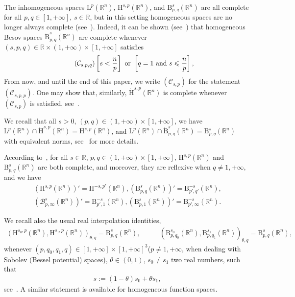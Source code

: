 \documentclass[AHL,Unicode,longabstracts,published]{cedram}
\newcommand{\bbR}{\mathbb{R}}
\newcommand{\rmH}{\mathrm{H}}%
\newcommand{\rmB}{\mathrm{B}}
\newcommand{\rmL}{\mathrm{L}}
\newcommand{\clB}{\mathcal{B}}
\newcommand{\clC}{\mathcal{C}}
\begin{document}
The inhomogeneous spaces $\rmL^p(\bbR^n)$, $\rmH^{s,p}(\bbR^n)$, and $\rmB^{s}_{p,q}(\bbR^n)$ are all complete for all $p,q\in [1,+\infty]$, $s\in\bbR$, but in this setting homogeneous spaces are no longer always complete (see~\cite[Proposition~1.34,~Remark~2.26]{bookBahouriCheminDanchin}). Indeed, it can be shown (see~\cite[Theorem~2.25]{bookBahouriCheminDanchin}) that homogeneous Besov spaces $\dot{\rmB}^{s}_{p,q}(\bbR^n)$ are complete whenever $(s,p,q)\in\bbR\times(1,+\infty)\times[1,+\infty]$ satisfies
\begin{equation}
\tag{$\clC_{s,p,q}$}\label{AssumptionCompletenessExponents}
\left[s<\frac{n}{p} \right]\text{ or }\left[q=1\text{ and } s\leqslant\frac{n}{p} \right],
\end{equation}
From now, and until the end of this paper, we write $(\clC_{s,p})$ for the statement $(\clC_{s,p,p})$. One may show that, similarly, $\dot{\rmH}^{s,p}(\bbR^n)$ is complete whenever $(\clC_{s,p})$ is satisfied, see~\cite[Proposition~2.2]{Gaudin2022}.

We recall that all $s>0$, $(p,q)\in(1,+\infty)\times[1,+\infty]$, we have $\rmL^p(\bbR^n)\cap \dot{\rmH}^{s,p}(\bbR^n) = \rmH^{s,p}(\bbR^n)$, and $\rmL^p(\bbR^n)\cap \dot{\rmB}^{s}_{p,q}(\bbR^n) =\rmB^{s}_{p,q}(\bbR^n)$ with equivalent norms, see~\cite[Theorem~6.3.2]{BerghLofstrom1976} for more details.

According to~\cite[Section~6.4]{BerghLofstrom1976}, for all $s\in\bbR$, $p,q\in(1,+\infty)\times[1,+\infty]$, $\rmH^{s,p}(\bbR^n)$ and $\rmB^{s}_{p,q}(\bbR^n)$ are both complete, and moreover, they are reflexive when $q\neq1,+\infty$, and we have
\begin{align}
(\rmH^{s,p}(\bbR^n))' = \rmH^{-s,p'}(\bbR^n),  \left(\rmB^{s}_{p,q}(\bbR^n)\right)'=\rmB^{-s}_{p',q'}(\bbR^n) \text{,}\\
\left(\clB^{s}_{p,\infty}(\bbR^n)\right)'=\rmB^{-s}_{p',1}(\bbR^n), \left(\rmB^{s}_{p,1}(\bbR^n)\right)'=\rmB^{-s}_{p',\infty}(\bbR^n) .
\end{align}

We recall also the usual real interpolation identities,
\begin{align*}
\left(\rmH^{s_0,p}(\bbR^n),\rmH^{s_1,p}(\bbR^n)\right)_{\theta,q}= \rmB^{s}_{p,q}(\bbR^n),&\qquad \left(\rmB^{s_0}_{p,q_0}(\bbR^n),\rmB^{s_1}_{p,q_1}(\bbR^n)\right)_{\theta,q} = \rmB^{s}_{p,q}(\bbR^n),
\end{align*}
whenever $(p,q_0,q_1,q)\in[1,+\infty]\times[1,+\infty]^3$($p\neq 1,+\infty$, when dealing with Sobolev (Bessel potential) spaces), $\theta\in(0,1)$, $s_0\neq s_1$ two real numbers, such that
\begin{align*}
s:= (1-\theta)s_0+ \theta s_1,
\end{align*}
see~\cite[Theorem~6.4.5]{BerghLofstrom1976}. A similar statement is available for homogeneous function spaces.
\end{document}
